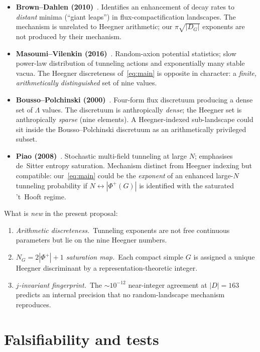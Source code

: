 \documentclass[11pt,a4paper]{article}
\theoremstyle{plain}
\theoremstyle{definition}
\newcommand{\Phip}{\Phi^{+}}
\begin{document}
\begin{itemize}
\setlength\itemsep{0pt}
\item \textbf{Brown--Dahlen (2010)}~\cite{BrownDahlen2010}. Identifies an enhancement of decay rates to \emph{distant} minima (``giant leaps'') in flux-compactification landscapes. The mechanism is unrelated to Heegner arithmetic; our $\pi\sqrt{|D_G|}$ exponents are not produced by their mechanism.
\item \textbf{Masoumi--Vilenkin (2016)}~\cite{MasoumiVilenkin2016}. Random-axion potential statistics; slow power-law distribution of tunneling actions and exponentially many stable vacua. The Heegner discreteness of~\eqref{eq:main} is opposite in character: a \emph{finite, arithmetically distinguished} set of nine values.
\item \textbf{Bousso--Polchinski (2000)}~\cite{BoussoPolchinski2000}. Four-form flux discretuum producing a dense set of $\Lambda$ values. The discretuum is anthropically \emph{dense}; the Heegner set is anthropically \emph{sparse} (nine elements). A Heegner-indexed sub-landscape could sit inside the Bousso--Polchinski discretuum as an arithmetically privileged subset.
\item \textbf{Piao (2008)}~\cite{Piao2008}. Stochastic multi-field tunneling at large $N$; emphasises de~Sitter entropy saturation. Mechanism distinct from Heegner indexing but compatible: our~\eqref{eq:main} could be the \emph{exponent} of an enhanced large-$N$ tunneling probability if $N\leftrightarrow|\Phip(G)|$ is identified with the saturated 't~Hooft regime.
\end{itemize}

What is \emph{new} in the present proposal:
\begin{enumerate}
\setlength\itemsep{0pt}
\item \emph{Arithmetic discreteness.}~Tunneling exponents are not free continuous parameters but lie on the nine Heegner numbers.
\item \emph{$N_G=2|\Phip|+1$ saturation map.}~Each compact simple $G$ is assigned a unique Heegner discriminant by a representation-theoretic integer.
\item \emph{$j$-invariant fingerprint.}~The $\sim 10^{-12}$ near-integer agreement at $|D|=163$ predicts an internal precision that no random-landscape mechanism reproduces.
\end{enumerate}

\section{Falsifiability and tests}\label{sec:falsif}
\end{document}
